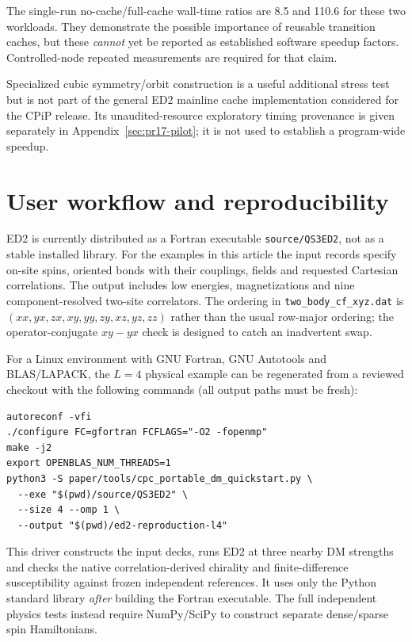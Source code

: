 \documentclass[preprint,12pt,nopreprintline]{elsarticle}
\begin{document}
The single-run no-cache/full-cache wall-time ratios
are 8.5 and 110.6 for these two workloads.
They demonstrate the possible importance of reusable
transition caches, but these \emph{cannot} yet be
reported as established software speedup factors.
Controlled-node repeated measurements are required
for that claim.


Specialized cubic symmetry/orbit construction is a useful
additional stress test but is not part of the general ED2
mainline cache implementation considered for the CPiP release.
Its unaudited-resource exploratory timing provenance is given
separately in Appendix~\ref{sec:pr17-pilot};
it is not used to establish a program-wide speedup.

\section{User workflow and reproducibility}
ED2 is currently distributed as a Fortran executable
\texttt{source/QS3ED2}, not as a stable installed library.
For the examples in this article the input records specify
on-site spins, oriented bonds with their couplings, fields
and requested Cartesian correlations. The output includes
low energies, magnetizations and nine component-resolved
two-site correlators. The ordering in
\texttt{two\_body\_cf\_xyz.dat} is
$(xx,yx,zx,xy,yy,zy,xz,yz,zz)$ rather than
the usual row-major ordering; the operator-conjugate
$xy-yx$ check is designed to catch an inadvertent swap.

For a Linux environment with GNU Fortran, GNU Autotools
and BLAS/LAPACK, the $L=4$ physical example can be
regenerated from a reviewed checkout with the following
commands (all output paths must be fresh):
\begin{verbatim}
autoreconf -vfi
./configure FC=gfortran FCFLAGS="-O2 -fopenmp"
make -j2
export OPENBLAS_NUM_THREADS=1
python3 -S paper/tools/cpc_portable_dm_quickstart.py \
  --exe "$(pwd)/source/QS3ED2" \
  --size 4 --omp 1 \
  --output "$(pwd)/ed2-reproduction-l4"
\end{verbatim}
This driver constructs the input decks, runs ED2
at three nearby DM strengths and checks the native
correlation-derived chirality and finite-difference
susceptibility against frozen independent references.
It uses only the Python standard library \emph{after}
building the Fortran executable. The full independent
physics tests instead require NumPy/SciPy to construct
separate dense/sparse spin Hamiltonians.
\end{document}
